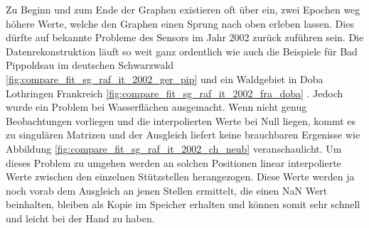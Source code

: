 \documentclass[11pt]{report}
\begin{document}
Zu Beginn und zum Ende der Graphen existieren oft über ein, zwei Epochen weg höhere Werte, welche den Graphen einen Sprung nach oben erleben lassen. Dies dürfte auf bekannte Probleme des Sensors im Jahr 2002 zurück zuführen sein. Die Datenrekonstruktion läuft so weit ganz ordentlich wie auch die Beispiele für Bad Pippoldsau im deutschen Schwarzwald \ref{fig:compare_fit_sg_raf_it_2002_ger_pip} und ein Waldgebiet in Doba Lothringen Frankreich \ref{fig:compare_fit_sg_raf_it_2002_fra_doba} . Jedoch wurde ein Problem bei Wasserflächen ausgemacht. Wenn nicht genug Beobachtungen vorliegen und die interpolierten Werte bei Null liegen, kommt es zu singulären Matrizen und der Ausgleich liefert keine brauchbaren Ergenisse wie  Abbildung \ref{fig:compare_fit_sg_raf_it_2002_ch_neub} veranschaulicht. Um dieses Problem zu umgehen werden an solchen Positionen linear interpolierte Werte zwischen den einzelnen Stützstellen herangezogen. Diese Werte werden ja noch vorab dem Ausgleich an jenen Stellen ermittelt, die einen NaN Wert beinhalten, bleiben als Kopie im Speicher erhalten und können somit sehr schnell und leicht bei der Hand zu haben.
\end{document}
